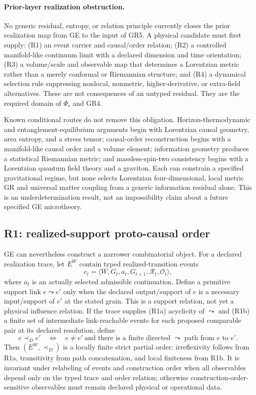 \documentclass[11pt,a4paper]{article}
\theoremstyle{remark}
\newcommand{\Obs}{\mathcal O}
\begin{document}
\paragraph{Prior-layer realization obstruction.}
No generic residual, entropy, or relation principle currently closes the prior
realization map from GE to the input of GR5. A physical candidate must first
supply: (R1) an event carrier and causal/order relation; (R2) a controlled
manifold-like continuum limit with a declared dimension and time orientation;
(R3) a volume/scale and observable map that determines a Lorentzian metric
rather than a merely conformal or Riemannian structure; and (R4) a dynamical
selection rule suppressing nonlocal, nonmetric, higher-derivative, or
extra-field alternatives. These are not consequences of an untyped residual.
They are the required domain of $\Phi_\epsilon$ and GR4.

Known conditional routes do not remove this obligation. Horizon-thermodynamic
and entanglement-equilibrium arguments begin with Lorentzian causal geometry,
area entropy, and a stress tensor; causal-order reconstruction begins with a
manifold-like causal order and a volume element; information geometry produces
a statistical Riemannian metric; and massless-spin-two consistency begins with
a Lorentzian quantum field theory and a graviton. Each can constrain a
specified gravitational regime, but none selects Lorentzian four-dimensional,
local metric GR and universal matter coupling from a generic information
residual alone. This is an underdetermination result, not an impossibility claim
about a future specified GE microtheory.

\subsection{R1: realized-support proto-causal order}
GE can nevertheless construct a narrower combinatorial object. For a declared
realization trace, let $E^W$ contain typed realized-transition events
\[
 e_t=\langle W,G_t,a_t,G_{t+1},\mathcal R_t,\Obs_t\rangle,
\]
where $a_t$ is an actually selected admissible continuation. Define a primitive
support link $e\leadsto e'$ only when the declared output/support of $e$ is a
necessary input/support of $e'$ at the stated grain. This is a support relation,
not yet a physical influence relation. If the trace supplies (R1a) acyclicity of
$\leadsto$ and (R1b) a finite set of intermediate link-reachable events for
each proposed comparable pair at its declared resolution, define
\[
 e\prec_D e'\quad\Longleftrightarrow\quad
 e\neq e'\ \text{and there is a finite directed $\leadsto$ path from $e$ to $e'$}.
 \tag{R1}
\]
Then $(E^W,\prec_D)$ is a locally finite strict partial order: irreflexivity
follows from R1a, transitivity from path concatenation, and local finiteness
from R1b. It is invariant under relabeling of events and construction order
when all observables depend only on the typed trace and order relation; otherwise
construction-order-sensitive observables must remain declared physical or
operational data.
\end{document}
